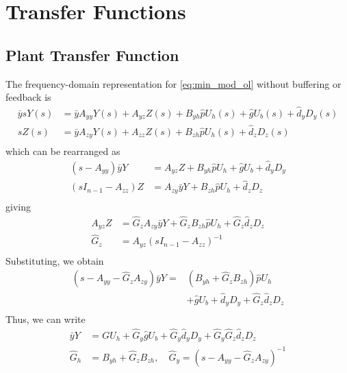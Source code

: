 \documentclass[letterpaper, 10 pt,  conference]{ieeeconf}  %
\begin{document}
\section{Transfer Functions}

\subsection{Plant Transfer Function}

The frequency-domain representation for \eqref{eq:min_mod_ol} without buffering or feedback is
\begin{equation*}
\begin{aligned}
\bar{y}sY(s)&=\bar{y}A_{yy}Y(s)+A_{yz}Z(s)+B_{yh}\hat{p}U_h(s)+\hat{g}U_b(s)+\hat d_yD_y(s)\\
sZ(s)&=\bar{y}A_{zy}Y(s)+A_{zz}Z(s)+B_{zh}\hat{p}U_h(s)+\hat d_zD_z(s)\\
\end{aligned}
\end{equation*}
which can be rearranged as
\begin{equation*}
\begin{aligned}
(s-A_{yy})\bar{y}Y&=A_{yz}Z+B_{yh}\hat{p}U_h+\hat{g}U_b+\hat d_yD_y\\
(sI_{n-1}-A_{zz})Z&=A_{zy}\bar{y}Y+B_{zh}\hat{p}U_h+\hat d_zD_z\\
\end{aligned}
\end{equation*}
giving
\begin{equation*}
\begin{aligned}
A_{yz}Z&=\hat G_zA_{zy}\bar{y}Y+\hat G_zB_{zh}\hat{p}U_h+\hat G_z\hat d_zD_z\\
\hat G_z &= A_{yz}(sI_{n-1}-A_{zz})^{-1}\\
\end{aligned}
\end{equation*}
Substituting, we obtain
\begin{equation*}
\begin{aligned}
(s-A_{yy}-\hat G_zA_{zy})\bar{y}Y=&(B_{yh}+\hat G_zB_{zh})\hat{p}U_h\\
&+\hat{g}U_b+\hat d_yD_y+\hat G_z\hat d_zD_z\\
\end{aligned}
\end{equation*}
Thus, we can write 
\begin{equation*}
\begin{aligned}
\bar{y}Y&=GU_h+\hat G_y\hat{g}U_b+\hat G_y\hat d_yD_y+\hat G_y\hat G_z\hat d_zD_z\\
\hat G_h&=B_{yh}+\hat G_zB_{zh},\quad \hat G_y =(s-A_{yy}-\hat G_zA_{zy})^{-1}\\
\end{aligned}
\end{equation*}
\end{document}

